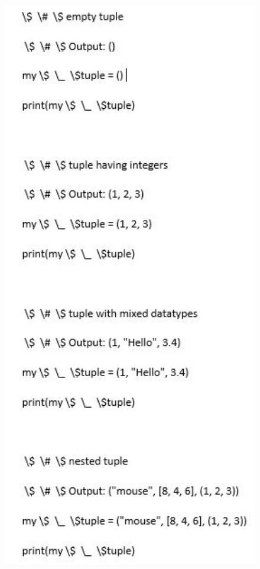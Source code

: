 \begin{figure}[ht]
			\centerline{\includegraphics[width=1\textwidth]{Plagiarisme/3afs1.JPG}}
			\caption{}
			\label{3afs1}
			\end{figure}
   
